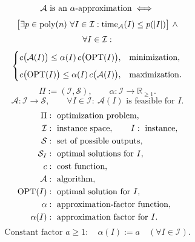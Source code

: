 \documentclass[12pt,a4paper]{article}
\begin{document}
\noindent\begin{minipage}{\linewidth}
\begin{definition}
\label{def:alpha-approximation}
\[
\begin{gathered}
\mathcal A\ \text{is an}\ \alpha\text{-approximation}
\iff\\[3pt]
\bigl[\exists p\in\operatorname{poly}(n)\ \forall I\in\mathcal I:
\mathrm{time}_{\mathcal A}(I)\leq p(|I|)\bigr]\ \land\\[3pt]
\forall I\in\mathcal I:\\[3pt]
\begin{cases}
c\bigl(\mathcal A(I)\bigr)\leq\alpha(I)\,c\bigl(\operatorname{OPT}(I)\bigr), & \text{minimization},\\[0.6em]
c\bigl(\operatorname{OPT}(I)\bigr)\leq\alpha(I)\,c\bigl(\mathcal A(I)\bigr), & \text{maximization}.
\end{cases}
\end{gathered}
\]
\[
\Pi:=(\mathcal I,\mathcal S),
\qquad \alpha:\mathcal I\to\mathbb R_{\geq1}.
\]
\[
\mathcal A:\mathcal I\to\mathcal S,
\qquad \forall I\in\mathcal I:\ \mathcal A(I)\text{ is feasible for }I.
\]
\[
\begin{aligned}
\Pi&:\text{ optimization problem},\\
\mathcal I&:\text{ instance space},\qquad I:\text{ instance},\\
\mathcal S&:\text{ set of possible outputs},\\
\mathcal S_I&:\text{ optimal solutions for }I,\\
c&:\text{ cost function},\\
\mathcal A&:\text{ algorithm},\\
\operatorname{OPT}(I)&:\text{ optimal solution for }I,\\
\alpha&:\text{ approximation-factor function},\\
\alpha(I)&:\text{ approximation factor for }I.
\end{aligned}
\]
\[
\text{Constant factor }a\geq1:\quad \alpha(I):=a\quad(\forall I\in\mathcal I).
\]
\end{definition}
\end{minipage}\par
\end{document}
